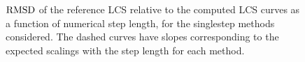 \begin{figure}[htpb]
    \centering
        
    \caption[$\rmsd$ of the reference LCS relative to the computed LCS curves
    as a function of numerical step length, for the singlestep methods
    considered]
        {$\rmsd$ of the reference LCS relative to the computed LCS curves as a
        function of numerical step length, for the singlestep methods
        considered. The dashed curves have slopes corresponding to the expected scalings
        with the step length for each method.}
    \label{fig:lcs_rmsd_fn_nn_fixed}
\end{figure}
